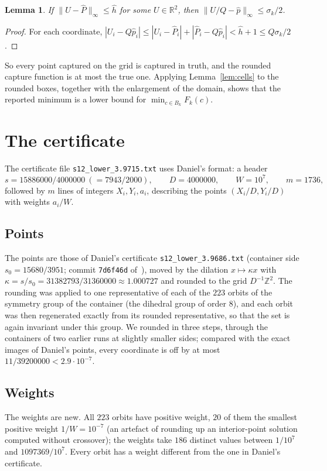 \documentclass[11pt]{amsart}
\newtheorem{lemma}[theorem]{Lemma}
\theoremstyle{definition}
\theoremstyle{remark}
\newcommand{\R}{\mathbb{R}}
\newcommand{\Z}{\mathbb{Z}}
\newcommand{\sfrac}{7943/2000}          %
\newcommand{\Unum}{15886000}             %
\newcommand{\certfile}{\texttt{s12\_lower\_3.9715.txt}}
\newcommand{\ndist}{186}
\newcommand{\wlo}{1}
\newcommand{\whi}{1097369}
\newcommand{\devbound}{11/39200000}
\newcommand{\lam}{31382793/31360000}
\begin{document}
\begin{lemma}\label{lem:rounding}
If $\|U-\hat P\|_\infty\le\hat h$ for some $U\in\R^2$, then $\|U/Q-\hat p\|_\infty\le\sigma_k/2$.
\end{lemma}

\begin{proof}
For each coordinate, $|U_i-Q\hat p_i|\le|U_i-\hat P_i|+|\hat P_i-Q\hat p_i|<\hat h+1\le Q\sigma_k/2$.
\end{proof}

So every point captured on the grid is captured in truth, and the rounded capture function is at most the true one. Applying Lemma~\ref{lem:cells} to the rounded boxes, together with the enlargement of the domain, shows that the reported minimum is a lower bound for $\min_{c\in B_k}F_k(c)$.

\section{The certificate}\label{sec:cert}

The certificate file \certfile{} uses Daniel's format: a header
\[
  s=\Unum/4000000\ (=\sfrac),\qquad D=4000000,\qquad W=10^7,\qquad m=1736,
\]
followed by $m$ lines of integers $X_i,Y_i,a_i$, describing the points $(X_i/D,Y_i/D)$ with weights $a_i/W$.

\subsection*{Points}
The points are those of Daniel's certificate \texttt{s12\_lower\_3.9686.txt} (container side $s_0=15680/3951$; commit \texttt{7d6f46d} of~\cite{Dan26}), moved by the dilation $x\mapsto\kappa x$ with $\kappa=s/s_0=\lam\approx1.000727$ and rounded to the grid $D^{-1}\Z^2$. The rounding was applied to one representative of each of the $223$ orbits of the symmetry group of the container (the dihedral group of order $8$), and each orbit was then regenerated exactly from its rounded representative, so that the set is again invariant under this group. We rounded in three steps, through the containers of two earlier runs at slightly smaller sides; compared with the exact images of Daniel's points, every coordinate is off by at most $\devbound<2.9\cdot10^{-7}$.

\subsection*{Weights}
The weights are new. All $223$ orbits have positive weight, $20$ of them the smallest positive weight $1/W=10^{-7}$ (an artefact of rounding up an interior-point solution computed without crossover); the weights take $\ndist$ distinct values between $\wlo/10^7$ and $\whi/10^7$. Every orbit has a weight different from the one in Daniel's certificate.
\end{document}
